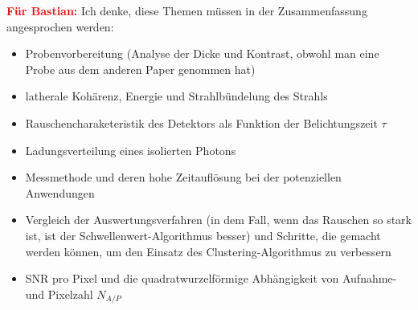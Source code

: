\textcolor{red}{\textbf{Für Bastian:}}
Ich denke, diese Themen müssen in der Zusammenfassung angesprochen werden:
\begin{itemize}
    \item Probenvorbereitung (Analyse der Dicke und Kontrast, obwohl man eine Probe aus dem anderen Paper genommen hat)
    \item latherale Kohärenz, Energie und Strahlbündelung des Strahls
    \item Rauschencharaketeristik des Detektors als Funktion der Belichtungszeit $\tau$
    \item Ladungsverteilung eines isolierten Photons
    \item Messmethode und deren hohe Zeitauflösung bei der potenziellen Anwendungen
    \item Vergleich der Auswertungsverfahren (in dem Fall, wenn das Rauschen so stark ist, ist der Schwellenwert-Algorithmus besser) und Schritte, die gemacht werden können, um den Einsatz des Clustering-Algorithmus zu verbessern
    \item SNR pro Pixel und die quadratwurzelförmige Abhängigkeit von Aufnahme- und Pixelzahl $N_{A/P}$
\end{itemize}